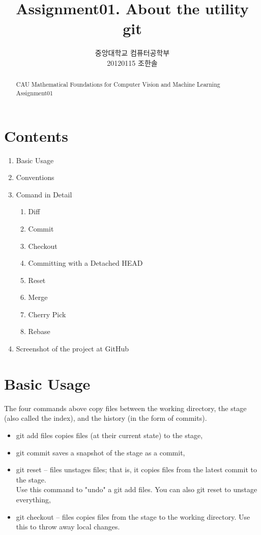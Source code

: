 \documentclass[a4paper]{article}
\title{Assignment01. About the utility git}
\author{중앙대학교 컴퓨터공학부 \\20120115 조한솔}
\begin{document}
\begin{CJK}{UTF8}{mj}
\maketitle

\begin{abstract}
CAU Mathematical Foundations for
Computer Vision and Machine Learning Assignment01
\end{abstract}

\section{Contents}

\begin{enumerate}
\item Basic Usage
\item Conventions
\item Comand in Detail
	\begin{enumerate}[label=(\alph*)]
    \item Diff
    \item Commit
    \item Checkout
    \item Committing with a Detached HEAD
    \item Reset
    \item Merge
    \item Cherry Pick
    \item Rebase
    \end{enumerate}
\item Screenshot of the project at GitHub
\end{enumerate}

%
%
\section{Basic Usage}

The four commands above copy files between the working directory, the stage (also called the index), and the history (in the form of commits).

\begin{itemize}
\item git add files copies files (at their current state) to the stage,
\item git commit saves a snapshot of the stage as a commit,
\item git reset -- files unstages files; that is, it copies files from the latest commit to the stage.\\Use this command to "undo" a git add files. You can also git reset to unstage everything,
\item git checkout -- files copies files from the stage to the working directory. Use this to throw away local changes.


\end{itemize}
\end{CJK}
\end{document}
